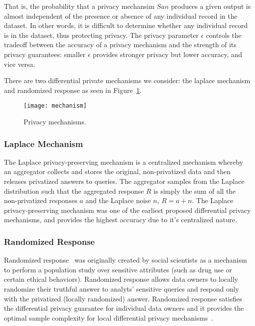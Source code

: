 \documentclass[conference]{IEEEtran}
\begin{document}
That is, the probability that a privacy mechansim $San$ produces a given output is almost independent of the presence or absence of any individual record in the dataset.  In other words, it is difficult to determine whether any individual record is in the dataset, thus protecting privacy.  The privacy parameter $\epsilon$ controls the tradeoff between the accuracy of a privacy mechanism and the strength of its privacy guarantees: smaller $\epsilon$ provides stronger privacy but lower accuracy, and vice versa.

There are two differential private mechanisms we consider: the laplace mechanism and randomized response as seen in Figure~\ref{fig:mechanism}.

\begin{figure}[t!]
\centering
\texttt{[image: mechanism]}
\caption{Privacy mechanisms.}
\label{fig:mechanism}
\end{figure}

\subsubsection{Laplace Mechanism}

The Laplace privacy-preserving mechanism \cite{DBLP:conf/icalp/Dwork06,DBLP:conf/tcc/DworkMNS06,DBLP:journals/fttcs/DworkR14} is a centralized mechanism whereby an aggregator collects and stores the original, non-privatized data and then releases privatized answers to queries. The aggregator samples from the Laplace distribution such that the aggregated response $R$ is simply the sum of all the non-privatized responses $a$ and the Laplace noise $n$, $R = a + n$. The Laplace privacy-preserving mechanism was one of the earliest proposed differential privacy mechanisms, and provides the highest accuracy due to it's centralized nature.



\subsubsection{Randomized Response}
 
 
Randomized response~\cite{warner1965randomized} was originally created by social scientists as a mechanism to perform a population study over sensitive attributes (such as drug use or certain ethical behaviors). Randomized response allows data owners to locally randomize their truthful answer to analyts' sensitive queries and respond only with the privatized (locally randomized) answer. Randomized response satisfies the differential privacy guarantee for individual data owners and  it provides the optimal sample complexity for local differential privacy mechanisms~\cite{DBLP:conf/nips/DuchiWJ13}.
\end{document}
